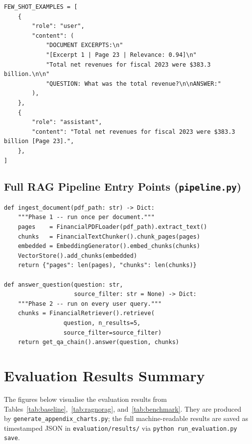 \documentclass[12pt,a4paper]{article}
\begin{document}
\begin{lstlisting}[caption={Two-shot in-context learning examples embedded in prompt}]
FEW_SHOT_EXAMPLES = [
    {
        "role": "user",
        "content": (
            "DOCUMENT EXCERPTS:\n"
            "[Excerpt 1 | Page 23 | Relevance: 0.94]\n"
            "Total net revenues for fiscal 2023 were $383.3 billion.\n\n"
            "QUESTION: What was the total revenue?\n\nANSWER:"
        ),
    },
    {
        "role": "assistant",
        "content": "Total net revenues for fiscal 2023 were $383.3 billion [Page 23].",
    },
]
\end{lstlisting}

\subsection{Full RAG Pipeline Entry Points (\texttt{pipeline.py})}

\begin{lstlisting}[caption={Two pipeline functions: ingest\_document (Phase 1) and answer\_question (Phase 2)}]
def ingest_document(pdf_path: str) -> Dict:
    """Phase 1 -- run once per document."""
    pages    = FinancialPDFLoader(pdf_path).extract_text()
    chunks   = FinancialTextChunker().chunk_pages(pages)
    embedded = EmbeddingGenerator().embed_chunks(chunks)
    VectorStore().add_chunks(embedded)
    return {"pages": len(pages), "chunks": len(chunks)}

def answer_question(question: str,
                    source_filter: str = None) -> Dict:
    """Phase 2 -- run on every user query."""
    chunks = FinancialRetriever().retrieve(
                 question, n_results=5,
                 source_filter=source_filter)
    return get_qa_chain().answer(question, chunks)
\end{lstlisting}

\section{Evaluation Results Summary}

The figures below visualise the evaluation results from Tables~\ref{tab:baseline},~\ref{tab:ragnorag}, and~\ref{tab:benchmark}. They are produced by \texttt{generate\_appendix\_charts.py}; the full machine-readable results are saved as timestamped JSON in \texttt{evaluation/results/} via \texttt{python run\_evaluation.py \text{-{}-}save}.
\end{document}
